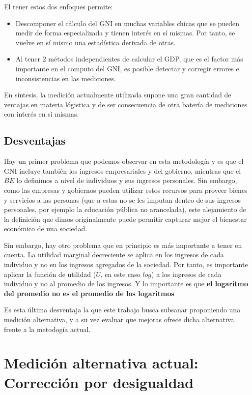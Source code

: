 El tener estos dos enfoques permite:

\begin{itemize}
    \item Descomponer el cálculo del GNI en muchas variables chicas que se pueden medir de forma especializada y tienen interés en sí mismas. Por tanto, se vuelve en sí mismo una estadística derivada de otras.
    \item Al tener 2 métodos independientes de calcular el GDP, que es el factor más importante en el computo del GNI, es posible detectar y corregir errores e inconsistencias en las mediciones.
\end{itemize}

En síntesis, la medición actualmente utilizada supone una gran cantidad de ventajas en materia lógistica y de ser consecuencia de otra batería de mediciones con interés en si mismas.

\subsection{Desventajas}

Hay un primer problema que podemos observar en esta metodología y es que el GNI incluye también los ingresos empresariales y del gobierno, mientras que el $BE$ lo definimos a nivel de individuos y sus ingresos personales. Sin embargo, como las empresas y gobiernos pueden utilizar estos recursos para proveer bienes y servicios a las personas (que a estas no se les imputan dentro de sus ingresos personales, por ejemplo la educación pública no arancelada), este alejamiento de la definición que dimos originalmente puede permitir capturar mejor el bienestar económico de una sociedad. 

Sin embargo, hay otro problema que en principio es más importante a tener en cuenta. La utilidad marginal decreciente se aplica en los ingresos de cada individuo y no en los ingresos agregados de la sociedad. Por tanto, es importante aplicar la función de utilidad ($U$, en este caso $log$) a los ingresos de cada individuo y no al promedio de los ingresos. Y lo importante es que \textbf{el logaritmo del promedio no es el promedio de los logaritmos}

Es esta última desventaja la que este trabajo busca subsanar proponiendo una medición alternativa, y a su vez evaluar que mejoras ofrece dicha alternativa frente a la metodogía actual.

\section{Medición alternativa actual: Corrección por desigualdad}


